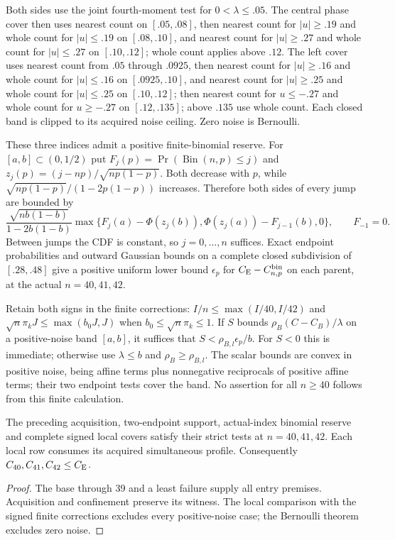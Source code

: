 Both sides use the joint fourth-moment test for $0<\lambda\le.05$.
The central phase cover then uses nearest count on $[.05,.08]$,
then nearest count for $|u|\ge.19$ and whole count for $|u|\le.19$
on $[.08,.10]$, and nearest count for $|u|\ge.27$ and whole
count for $|u|\le.27$ on $[.10,.12]$;
whole count applies above $.12$.
The left cover uses nearest count from $.05$ through $.0925$, then nearest
count for $|u|\ge.16$ and whole count for $|u|\le.16$ on
$[.0925,.10]$, and nearest count for $|u|\ge.25$ and whole count
for $|u|\le.25$ on $[.10,.12]$; then nearest count for $u\le-.27$
and whole count for $u\ge-.27$ on $[.12,.135]$; above $.135$
use whole count. Each closed band is clipped to its acquired noise
ceiling. Zero noise is Bernoulli.

These three indices admit a positive finite-binomial reserve. For
$[a,b]\subset(0,1/2)$ put
$F_j(p)=\Pr(\operatorname{Bin}(n,p)\le j)$ and
$z_j(p)=(j-np)/\sqrt{np(1-p)}$. Both decrease with $p$, while
$\sqrt{np(1-p)}/(1-2p(1-p))$ increases. Therefore both sides of
every jump are bounded by
\begin{equation}\label{j:finite:binomialslack}
 \frac{\sqrt{nb(1-b)}}{1-2b(1-b)}
 \max\{F_j(a)-\Phi(z_j(b)),\Phi(z_j(a))-F_{j-1}(b),0\},
 \qquad F_{-1}=0.
\end{equation}
Between jumps the CDF is constant, so $j=0,\ldots,n$ suffices.
Exact endpoint probabilities and outward Gaussian bounds on a complete
closed subdivision of $[.28,.48]$ give a positive uniform lower bound
$\epsilon_p$ for $C_{\mathrm E}-C^{\rm bin}_{n,p}$ on each parent, at the actual
$n=40,41,42$.

Retain both signs in the finite corrections:
$I/n\le\max(I/40,I/42)$ and
$\sqrt n\pi_kJ\le\max(b_0J,J)$ when $b_0\le\sqrt n\pi_k\le1$.
If $S$ bounds $\rho_B(C-C_B)/\lambda$ on a positive-noise band
$[a,b]$, it suffices that $S<\rho_{B,l}\epsilon_p/b$.
For $S<0$ this is immediate; otherwise use $\lambda\le b$ and
$\rho_B\ge\rho_{B,l}$. The scalar bounds are convex in positive
noise, being affine terms plus nonnegative reciprocals of positive
affine terms; their two endpoint tests cover the band. No assertion
for all $n\ge40$ follows from this finite calculation.

\begin{proposition}\label{j:finite:numerical4042}
The preceding acquisition, two-endpoint support, actual-index binomial
reserve and complete signed local covers satisfy their strict tests
at $n=40,41,42$. Each local row consumes its acquired simultaneous
profile. Consequently $C_{40},C_{41},C_{42}\le C_{\mathrm E}$.
\end{proposition}
\begin{proof}
The base through 39 and a least failure supply all entry premises.
Acquisition and confinement preserve its witness. The local comparison
with the signed finite corrections excludes every positive-noise case;
the Bernoulli theorem excludes zero noise.
\end{proof}

